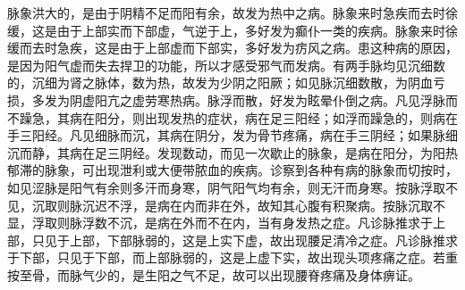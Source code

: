 \documentclass[a4paper,12pt,UTF8,twoside]{ctexbook}
\begin{document}
脉象洪大的，是由于阴精不足而阳有余，故发为热中之病。脉象来时急疾而去时徐缓，这是由于上部实而下部虚，气逆于上，多好发为癫仆一类的疾病。脉象来时徐缓而去时急疾，这是由于上部虚而下部实，多好发为疠风之病。患这种病的原因，是因为阳气虚而失去捍卫的功能，所以才感受邪气而发病。有两手脉均见沉细数的，沉细为肾之脉体，数为热，故发为少阴之阳厥；如见脉沉细数散，为阴血亏损，多发为阴虚阳亢之虚劳寒热病。脉浮而散，好发为眩晕仆倒之病。凡见浮脉而不躁急，其病在阳分，则出现发热的症状，病在足三阳经；如浮而躁急的，则病在手三阳经。凡见细脉而沉，其病在阴分，发为骨节疼痛，病在手三阴经；如果脉细沉而静，其病在足三阴经。发现数动，而见一次歇止的脉象，是病在阳分，为阳热郁滞的脉象，可出现泄利或大便带脓血的疾病。诊察到各种有病的脉象而切按时，如见涩脉是阳气有余则多汗而身寒，阴气阳气均有余，则无汗而身寒。按脉浮取不见，沉取则脉沉迟不浮，是病在内而非在外，故知其心腹有积聚病。按脉沉取不显，浮取则脉浮数不沉，是病在外而不在内，当有身发热之症。凡诊脉推求于上部，只见于上部，下部脉弱的，这是上实下虚，故出现腰足清冷之症。凡诊脉推求于下部，只见于下部，而上部脉弱的，这是上虚下实，故出现头项疼痛之症。若重按至骨，而脉气少的，是生阳之气不足，故可以出现腰脊疼痛及身体痹证。
\end{document}
